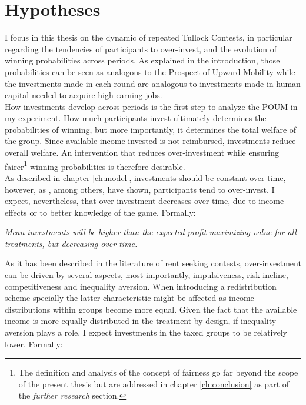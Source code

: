     \section{Hypotheses}\label{ss:hyp}
    
    I focus in this thesis on the dynamic of repeated Tullock Contests, in particular regarding the tendencies of participants to over-invest, and the evolution of winning probabilities across periods. As explained in the introduction, those probabilities can be seen as analogous to the Prospect of Upward Mobility while the investments made in each round are analogous to investments made in human capital needed to acquire high earning jobs.\\
    
    How investments develop across periods is the first step to analyze the POUM in my experiment. How much participants invest ultimately determines the probabilities of winning, but more importantly, it determines the total welfare of the group. Since available income invested is not reimbursed, investments reduce overall welfare. An intervention that reduces over-investment while ensuring fairer\footnote{The definition and analysis of the concept of fairness go far beyond the scope of the present thesis but are addressed in chapter \ref{ch:conclusion} as part of the \textit{further research} section.} winning probabilities is therefore desirable.\\
    
    As described in chapter \ref{ch:model}, investments should be constant over time, however, as \cite{sheremeta2016}, among others, have shown, participants tend to over-invest. I expect, nevertheless, that over-investment decreases over time, due to income effects or to better knowledge of the game. Formally:\\
    
     \begin{hyp} \label{hyp:treat}\textit{Mean investments will be higher than the expected profit maximizing value for all treatments, but decreasing over time.}\end{hyp}
    
    As it has been described in the literature of rent seeking contests, over-investment can be driven by several aspects, most importantly, impulsiveness, risk incline, competitiveness and inequality aversion. When introducing a redistribution scheme specially the latter characteristic might be affected as income distributions within groups become more equal. Given the fact that the available income is more equally distributed in the treatment by design, if inequality aversion plays a role, I expect investments in the taxed groups to be relatively  lower. Formally:\\
    
